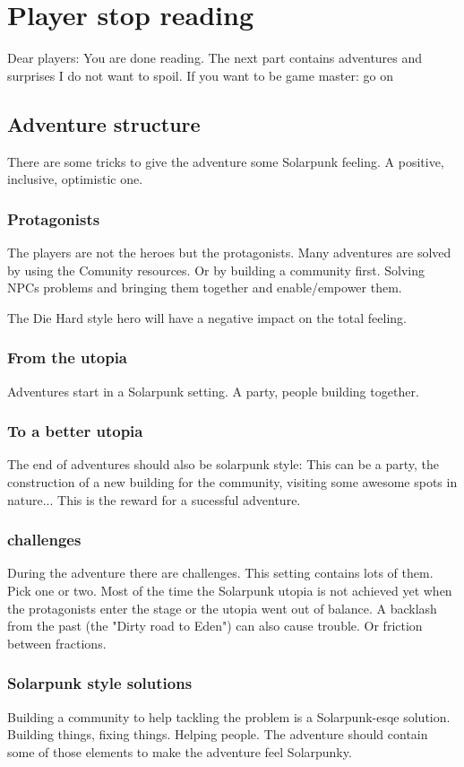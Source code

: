 \chapter{Player stop reading}

Dear players: You are done reading. The next part contains adventures and surprises I do not want to spoil. If you want to be game master: go on


\section{Adventure structure}

There are some tricks to give the adventure some Solarpunk feeling. A positive, inclusive, optimistic one.

\subsection{Protagonists}

The players are not the heroes but the protagonists. Many adventures are solved by using the Comunity resources.
Or by building a community first. Solving NPCs problems and bringing them together and enable/empower them.

The Die Hard style hero will have a negative impact on the total feeling.

\subsection{From the utopia}

Adventures start in a Solarpunk setting. A party, people building together.

\subsection{To a better utopia}

The end of adventures should also be solarpunk style: This can be a party, the construction of a new building for the community, visiting some awesome spots in nature... This is the reward for a sucessful adventure.

\subsection{challenges}

During the adventure there are challenges. This setting contains lots of them. Pick one or two. Most of the time the Solarpunk utopia is not achieved yet when the protagonists enter the stage or the utopia went out of balance. A backlash from the past (the "Dirty road to Eden") can also cause trouble. Or friction between fractions.

\subsection{Solarpunk style solutions}

Building a community to help tackling the problem is a Solarpunk-esqe solution. Building things, fixing things. Helping people. The adventure should contain some of those elements to make the adventure feel Solarpunky.

